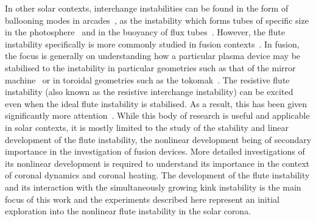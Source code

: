 \documentclass[fleqn,usenatbib]{mnras}
\newcommand{\rs}[2]{{#2}}
\begin{document}
In other solar contexts, interchange instabilities can be found in the
form of ballooning modes in
arcades~\citep{hoodBallooningInstabilitiesSolar1986}, as the
instability which forms tubes of specific size in the
photosphere~\citep{bunteInterchangeInstabilitySolar1993} and in the
buoyancy of flux
tubes~\citep{schuesslerInterchangeInstabilitySmall1984}. However, the
\rs{fluting}{flute} instability specifically is more commonly studied in fusion
contexts~\citep{mikhailovskiiInstabilitiesConfinedPlasma1998,zhengAdvancedTokamakStability2015,wessonHydromagneticStabilityTokamaks1978}. In
fusion, the focus is generally on understanding how a particular
plasma device may be stabilised to the instability in particular
geometries such as that of the mirror
machine~\citep{jungwirthTheoryFluteInstability1965} or in toroidal
geometries such as the
tokomak~\citep{shafranovFluteInstabilityCurrentcarrying1968}. The
resistive \rs{fluting}{flute} instability (also known as the resistive interchange
instability) can be excited even when the ideal \rs{fluting}{flute} instability is
stabilised. As a result, this has been given significantly more
attention~\citep{johnsonResistiveInterchangesNegativeV1967,correa-restrepoResistiveBallooningModes1983}. While
this body of research is useful and applicable in solar contexts, it
is mostly limited to the study of the stability and linear development
of the \rs{fluting}{flute} instability, the nonlinear development being of
secondary importance in the investigation of fusion devices. More
detailed investigations of its nonlinear development is required to
understand its importance in the context of coronal dynamics and
coronal heating. The development of the \rs{fluting}{flute} instability and its
interaction with the simultaneously growing kink instability is the
\rs{}{main} focus of this work and the experiments described here represent an
initial exploration into the nonlinear \rs{fluting}{flute} instability in the
solar corona.
\end{document}
